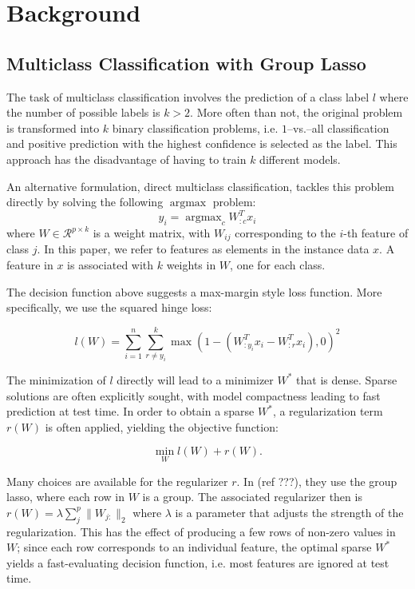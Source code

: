 \documentclass[11pt]{article}
\begin{document}
\section{Background}


\subsection{Multiclass Classification with Group Lasso}

The task of multiclass classification involves the prediction of a class label
$l$ where the number of possible labels is $k>2$. More often than not, the 
original problem is transformed into $k$ binary classification problems, i.e.
$1$--vs.--all classification and positive prediction with the highest 
confidence is selected as the label. This approach has the disadvantage of
having to train $k$ different models.

An alternative formulation, direct multiclass classification, tackles this 
problem directly by solving the following $\operatorname{argmax}$ problem:
$$y_i = \operatorname{argmax}_c W_{:c}^T x_i $$
where $W \in \mathcal{R}^{p \times k}$ is a weight matrix, with $W_{ij}$
corresponding to the $i$-th feature of class $j$. In this paper, we refer
to features as elements in the instance data $x$. A feature in $x$ is
associated with $k$ weights in $W$, one for each class.


The decision function above suggests a max-margin style loss function. More
specifically, we use the squared hinge loss:

$$ l(W) = \sum_{i=1}^n \sum_{r\ne y_i}^k 
    \max\left(1 - (W_{:y_i}^Tx_i - W_{:r}^Tx_i), 0\right)^2 $$

The minimization of $l$ directly will lead to a minimizer $W^*$ that is
dense. Sparse solutions are often explicitly sought, with model compactness
leading to fast prediction at test time. In order to obtain a sparse $W^*$,
a regularization term $r(W)$ is often applied, yielding the objective 
function:

$$\min_W l(W) + r(W).$$

Many choices are available for the regularizer $r$. In (ref ???), they use
the group lasso, where each row in $W$ is a group. The associated regularizer 
then is $r(W) = \lambda\sum_j^p \|W_{j:}\|_2$ where $\lambda$ is a parameter
that adjusts the strength of the regularization.
This has the effect of producing a few rows of non-zero values in $W$;
since each row corresponds to an individual feature, the optimal sparse $W^*$
yields a fast-evaluating decision function, i.e. most features are 
ignored at test time.
\end{document}
